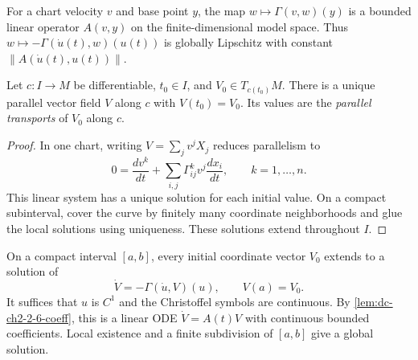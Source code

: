 \begin{lemma}
  \label{lem:dc-ch2-2-6-coeff}
  \leanok
  For a chart velocity $v$ and base point $y$, the map
  $w\mapsto\Gamma(v,w)(y)$ is a bounded linear operator $A(v,y)$ on the
  finite-dimensional model space. Thus
  $w\mapsto-\Gamma(\dot u(t),w)(u(t))$ is globally Lipschitz with constant
  $\lVert A(\dot u(t),u(t))\rVert$.
\end{lemma}

\begin{proposition}
  \label{prop:dc-ch2-2-6}
  \leanok
  Let $c\colon I\to M$ be differentiable, $t_0\in I$, and
  $V_0\in T_{c(t_0)}M$. There is a unique parallel vector field $V$ along $c$
  with $V(t_0)=V_0$. Its values are the \emph{parallel transports} of $V_0$
  along $c$.
\end{proposition}
\begin{proof}
  \leanok
  \sketch
  In one chart, writing $V=\sum_jv^jX_j$ reduces parallelism to
  \[
    0=\frac{dv^k}{dt}
      +\sum_{i,j}\Gamma_{ij}^kv^j\frac{dx_i}{dt},
      \qquad k=1,\dots,n.\tag{2}
  \]
  This linear system has a unique solution for each initial value. On a compact
  subinterval, cover the curve by finitely many coordinate neighborhoods and
  glue the local solutions using uniqueness. These solutions extend throughout
  $I$.
\end{proof}

\begin{lemma}
  \label{lem:dc-ch2-2-6-exist}
  \leanok
  On a compact interval $[a,b]$, every initial coordinate vector $V_0$ extends
  to a solution of
  \[
    \dot V=-\Gamma(\dot u,V)(u),\qquad V(a)=V_0.
  \]
  It suffices that $u$ is $C^1$ and the Christoffel symbols are continuous.
  \sketch
  By \cref{lem:dc-ch2-2-6-coeff}, this is a linear ODE
  $\dot V=A(t)V$ with continuous bounded coefficients. Local existence and a
  finite subdivision of $[a,b]$ give a global solution.
\end{lemma}

